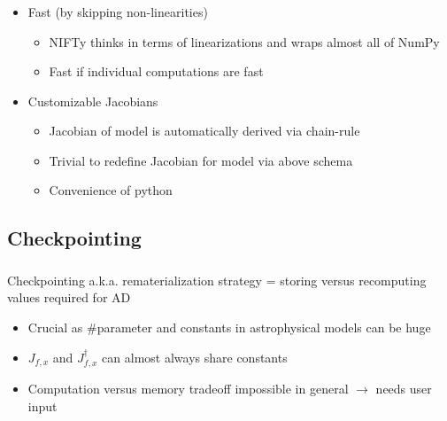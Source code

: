 \documentclass[aspectratio=169,xcolor=dvipsnames]{beamer}
\begin{document}
\begin{frame}
	\frametitle{\insertsection}
	\framesubtitle{\insertsubsection}

	\begin{itemize}
		\item Fast (by skipping non-linearities)
		\begin{itemize}
			\item NIFTy thinks in terms of linearizations and wraps almost all of NumPy
			\item Fast if individual computations are fast
		\end{itemize}
		\pause
		\item Customizable Jacobians
		\begin{itemize}
			\item Jacobian of model is automatically derived via chain-rule
			\item Trivial to redefine Jacobian for model via above schema
			\item Convenience of python
		\end{itemize}
	\end{itemize}

\end{frame}

\subsection{Checkpointing}
\begin{frame}
	\frametitle{\insertsection}
	\framesubtitle{\insertsubsection}

	Checkpointing a.k.a. rematerialization strategy = storing versus recomputing values required for AD

	\begin{itemize}
		\item Crucial as \#parameter and constants in astrophysical models can be huge
		\item $J_{f,x}$ and $J_{f,x}^\dagger$ can almost always share constants
		\item Computation versus memory tradeoff impossible in general $\rightarrow$ needs user input
	\end{itemize}

\end{frame}
\end{document}
